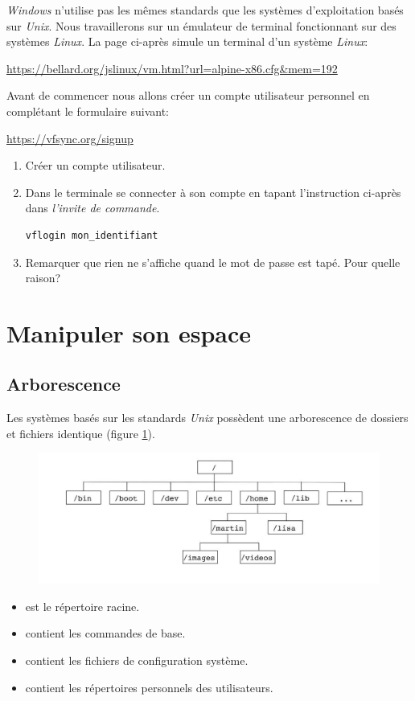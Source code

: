 \documentclass[a4paper,11pt]{article}
\begin{document}
\begin{Form}
\emph{Windows} n'utilise pas les mêmes standards que les systèmes d'exploitation basés sur \emph{Unix}. Nous travaillerons sur un émulateur de terminal fonctionnant sur des systèmes \emph{Linux}. La page ci-après simule un terminal d'un système \emph{Linux}:
\begin{center}
\url{https://bellard.org/jslinux/vm.html?url=alpine-x86.cfg&mem=192}
\end{center}
Avant de commencer nous allons créer un compte utilisateur personnel en complétant le formulaire suivant:
\begin{center}
\url{https://vfsync.org/signup}
\end{center}
\begin{activite}
\begin{enumerate}
\item Créer un compte utilisateur.
\item Dans le terminale se connecter à son compte en tapant l'instruction ci-après dans \emph{l'invite de commande}.
\begin{lstlisting}
vflogin mon_identifiant
\end{lstlisting}
\item Remarquer que rien ne s'affiche quand le mot de passe est tapé. Pour quelle raison?
\end{enumerate}
\end{activite}
\section{Manipuler son espace}
\subsection{Arborescence}
Les systèmes basés sur les standards \emph{Unix} possèdent une arborescence de dossiers et fichiers identique (figure \ref{arbo}).
\begin{figure}[!h]
\centering
\includegraphics[width=15cm]{ressources/arborescence.jpg}
\label{arbo}
\end{figure}
\begin{itemize}
\item \guill{/} est le répertoire racine.
\item {} contient les commandes de base.
\item {} contient les fichiers de configuration système.
\item {} contient les répertoires personnels des utilisateurs.
\end{itemize}

\end{Form}
\end{document}
